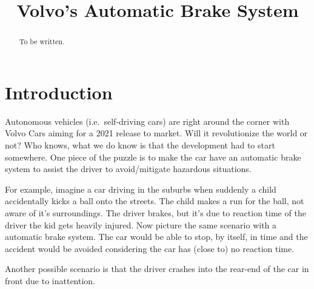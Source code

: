 \documentclass[conference]{IEEEtran}
\begin{document}
\title{Volvo's Automatic Brake System}

\author{
\and
{}
}

\maketitle

\begin{abstract}
To be written.
\end{abstract}


\section{Introduction}
Autonomous vehicles (i.e.\ self-driving cars) are right around the corner with Volvo Cars aiming for a 2021 release to market.\cite{ADToMarket} Will it revolutionize the world or not? Who knows, what we do know is that the development had to start somewhere. One piece of the puzzle is to make the car have an automatic brake system to assist the driver to avoid/mitigate hazardous situations. 

For example, imagine a car driving in the suburbs when suddenly a child accidentally kicks a ball onto the streets. The child makes a run for the ball, not aware of it's surroundings. The driver brakes, but it's due to reaction time of the driver the kid gets heavily injured. Now picture the same scenario with a automatic brake system. The car would be able to stop, by itself, in time and the accident would be avoided considering the car has (close to) no reaction time.

Another possible scenario is that the driver crashes into the rear-end of the car in front due to inattention.
\end{document}
